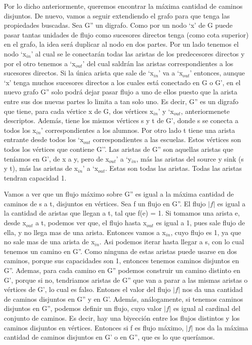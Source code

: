 Por lo dicho anteriormente, queremos encontrar la máxima cantidad de caminos disjuntos. De nuevo, vamos a seguir extendiendo el grafo para que tenga las 
propiedades buscadas. Sea G'' un digrafo.
Como por un nodo `x' de G puede pasar tantas unidades de flujo como sucesores directos tenga (como cota superior) en el grafo, la idea será duplicar al nodo en dos partes. Por un lado tenemos el nodo `x$_{in}$' al cual se le conectarán todas las aristas de los predecesores directos
 y por el otro tenemos a `x$_{out}$' del cual saldrán las aristas correspondientes a los sucesores directos. 
Si la única arista que sale de `x$_{in}$' va a `x$_{out}$' 
entonces, aunque `x' tenga muchos sucesores directos a los cuales está conectado en G o G', en el nuevo grafo G'' solo podrá dejar pasar flujo a uno de ellos puesto que la arista entre sus dos nuevas partes lo limita a tan solo uno.
Es decir, G'' es un digrafo que tiene, para cada vértice x de G, dos vértices x$_{in}$' y `x$_{out}$, anteriormenete descriptos. Además, tiene los mismos vértices s y t de G', 
donde s se conecta a todos los x$_{in}$' correspondientes a los alumnos. Por otro lado t tiene una arista entrante desde todos los `x$_{out}$ correspondientes a las escuelas. 
Estos vértices son todos los vértices que contiene G''. 
Las aristas de G'' son aquellas aristas que teníamos en G', de x a y, pero de x$_{out}$' a `y$_{in}$, más las aristas del source y sink (s y t), más las aristas de x$_{in}$' a `x$_{out}$. Estas son todas las aristas.
Todas las aristas tendran capacidad 1.

\par{Vamos a ver que un flujo máximo sobre G'' es igual a la máxima cantidad de caminos de s a t, disjuntos en vértices.
Sea f un flujo en G''. El flujo $|f|$ es igual a la cantidad de aristas que llegan a t, tal que f(e) = 1. Si tomamos una arista e, desde x$_{out}$ a t, podemos ver que, el flujo
hasta x$_{out}$ es igual a 1, pues sale flujo de ella, y no llega mas de una arista. Entonces vamos a x$_{in}$, cuyo flujo es 1, ya que no sale mas de una arista de x$_{in}$.
Asi podemos iterar hasta llegar a s, con lo cual tenemos un camino en G''. Como ninguna de estas aristas puede usarse en dos caminos, porque sus capacidades son 1,
entonces tenemos caminos disjuntos en G''. Ademas, para cada camino en G'' podemos construir un camino distinto en G', porque si no, tendriamos aristas de G'' que van a parar a las mismas aristas o vértices de G', lo cual es falso. 
Entones el valor del flujo $|f|$ nos da una cantidad de caminos disjuntos en G'' y en G'. 
Además, análogamente, si tenemos caminos disjuntos en G'', podemos definir un flujo, cuyo valor $|f|$ es igual al cardinal del conjunto de caminos. Es decir, hay una biyección entre
los flujos distintos y los caminos disjuntos en vértices.
Entonces si f es flujo máximo, $|f|$ nos da la máxima cantidad de caminos disjuntos en G' o en G'', que es lo que queríamos. }

